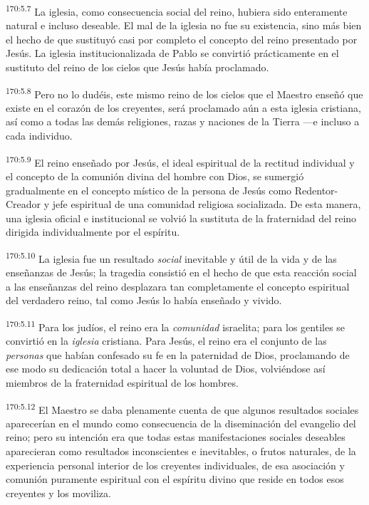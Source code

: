 \par 
\textsuperscript{170:5.7} La iglesia, como consecuencia social del reino, hubiera sido enteramente natural e incluso deseable. El mal de la iglesia no fue su existencia, sino más bien el hecho de que sustituyó casi por completo el concepto del reino presentado por Jesús. La iglesia institucionalizada de Pablo se convirtió prácticamente en el sustituto del reino de los cielos que Jesús había proclamado.

\par 
\textsuperscript{170:5.8} Pero no lo dudéis, este mismo reino de los cielos que el Maestro enseñó que existe en el corazón de los creyentes, será proclamado aún a esta iglesia cristiana, así como a todas las demás religiones, razas y naciones de la Tierra ---e incluso a cada individuo.

\par 
\textsuperscript{170:5.9} El reino enseñado por Jesús, el ideal espiritual de la rectitud individual y el concepto de la comunión divina del hombre con Dios, se sumergió gradualmente en el concepto místico de la persona de Jesús como Redentor-Creador y jefe espiritual de una comunidad religiosa socializada. De esta manera, una iglesia oficial e institucional se volvió la sustituta de la fraternidad del reino dirigida individualmente por el espíritu.

\par 
\textsuperscript{170:5.10} La iglesia fue un resultado \textit{social} inevitable y útil de la vida y de las enseñanzas de Jesús; la tragedia consistió en el hecho de que esta reacción social a las enseñanzas del reino desplazara tan completamente el concepto espiritual del verdadero reino, tal como Jesús lo había enseñado y vivido.

\par 
\textsuperscript{170:5.11} Para los judíos, el reino era la \textit{comunidad} israelita; para los gentiles se convirtió en la \textit{iglesia} cristiana. Para Jesús, el reino era el conjunto de las \textit{personas} que habían confesado su fe en la paternidad de Dios, proclamando de ese modo su dedicación total a hacer la voluntad de Dios, volviéndose así miembros de la fraternidad espiritual de los hombres.

\par 
\textsuperscript{170:5.12} El Maestro se daba plenamente cuenta de que algunos resultados sociales aparecerían en el mundo como consecuencia de la diseminación del evangelio del reino; pero su intención era que todas estas manifestaciones sociales deseables aparecieran como resultados inconscientes e inevitables, o frutos naturales, de la experiencia personal interior de los creyentes individuales, de esa asociación y comunión puramente espiritual con el espíritu divino que reside en todos esos creyentes y los moviliza.

